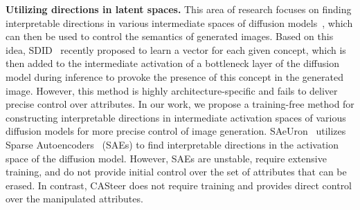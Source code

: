 \noindent\textbf{Utilizing directions in latent spaces.}  
This area of research focuses on finding interpretable directions in various intermediate spaces of diffusion models~\cite{DBLP:conf/iclr/KwonJU23, DBLP:conf/nips/ParkKCJU23, DBLP:conf/cvpr/SiH0024, DBLP:conf/cvpr/TumanyanGBD23}, which can then be used to control the semantics of generated images. Based on this idea, SDID~\cite{DBLP:conf/cvpr/0010S00G24} recently proposed to learn a vector for each given concept, which is then added to the intermediate activation of a bottleneck layer of the diffusion model during inference to provoke the presence of this concept in the generated image. However, this method is highly architecture-specific and fails to deliver precise control over attributes. In our work, we propose a training-free method for constructing interpretable directions in intermediate activation spaces of various diffusion models for more precise control of image generation. SAeUron~\cite{cywinski2025saeuron} utilizes Sparse Autoencoders~\cite{Olshausen1997SparseCW} (SAEs) to find interpretable directions in the activation space of the diffusion model. However, SAEs are unstable, require extensive training, and do not provide initial control over the set of attributes that can be erased. In contrast, CASteer does not require training and provides direct control over the manipulated attributes.



%



